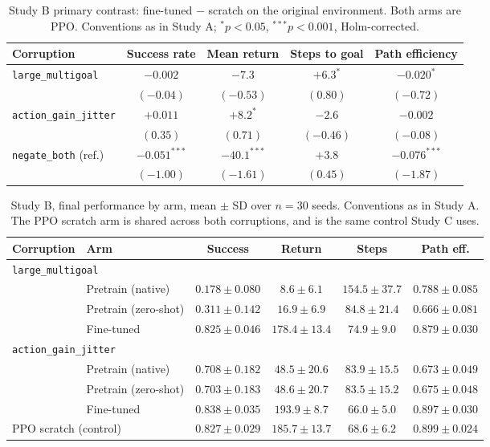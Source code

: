 \begin{table}[htbp]
\centering
\setlength{\tabcolsep}{4pt}
\caption{Study B primary contrast: fine-tuned $-$ scratch on the original
environment. Both arms are PPO. Conventions as in Study A;
${}^{*}p<0.05$, ${}^{***}p<0.001$, Holm-corrected.}
\small
\begin{tabular}{lcccc}
\toprule
Corruption & Success rate & Mean return & Steps to goal & Path efficiency \\
\midrule
\texttt{large\_multigoal} & $-0.002$ & $-7.3$ & $+6.3^{*}$ & $-0.020^{*}$ \\
 & \footnotesize$(-0.04)$ & \footnotesize$(-0.53)$ & \footnotesize$(0.80)$ & \footnotesize$(-0.72)$ \\[3pt]
\texttt{action\_gain\_jitter} & $+0.011$ & $+8.2^{*}$ & $-2.6$ & $-0.002$ \\
 & \footnotesize$(0.35)$ & \footnotesize$(0.71)$ & \footnotesize$(-0.46)$ & \footnotesize$(-0.08)$ \\[3pt]
\texttt{negate\_both} (ref.) & $-0.051^{***}$ & $-40.1^{***}$ & $+3.8$ & $-0.076^{***}$ \\
 & \footnotesize$(-1.00)$ & \footnotesize$(-1.61)$ & \footnotesize$(0.45)$ & \footnotesize$(-1.87)$ \\
\bottomrule
\end{tabular}
\end{table}

\begin{table}[htbp]
\centering
\setlength{\tabcolsep}{4pt}
\caption{Study B, final performance by arm, mean $\pm$ SD over $n=30$ seeds.
Conventions as in Study A. The PPO scratch arm is shared across both
corruptions, and is the same control Study C uses.}
\small
\begin{tabular}{llcccc}
\toprule
Corruption & Arm & Success & Return & Steps & Path eff. \\
\midrule
\multicolumn{6}{l}{\texttt{large\_multigoal}} \\
 & Pretrain (native)    & $0.178 \pm 0.080$ & $8.6 \pm 6.1$ & $154.5 \pm 37.7$ & $0.788 \pm 0.085$ \\
 & Pretrain (zero-shot) & $0.311 \pm 0.142$ & $16.9 \pm 6.9$ & $84.8 \pm 21.4$ & $0.666 \pm 0.081$ \\
 & Fine-tuned           & $0.825 \pm 0.046$ & $178.4 \pm 13.4$ & $74.9 \pm 9.0$ & $0.879 \pm 0.030$ \\
\midrule
\multicolumn{6}{l}{\texttt{action\_gain\_jitter}} \\
 & Pretrain (native)    & $0.708 \pm 0.182$ & $48.5 \pm 20.6$ & $83.9 \pm 15.5$ & $0.673 \pm 0.049$ \\
 & Pretrain (zero-shot) & $0.703 \pm 0.183$ & $48.6 \pm 20.7$ & $83.5 \pm 15.2$ & $0.675 \pm 0.048$ \\
 & Fine-tuned           & $0.838 \pm 0.035$ & $193.9 \pm 8.7$ & $66.0 \pm 5.0$ & $0.897 \pm 0.030$ \\
\midrule
\multicolumn{2}{l}{PPO scratch (control)} & $0.827 \pm 0.029$ & $185.7 \pm 13.7$ & $68.6 \pm 6.2$ & $0.899 \pm 0.024$ \\
\bottomrule
\end{tabular}
\end{table}


